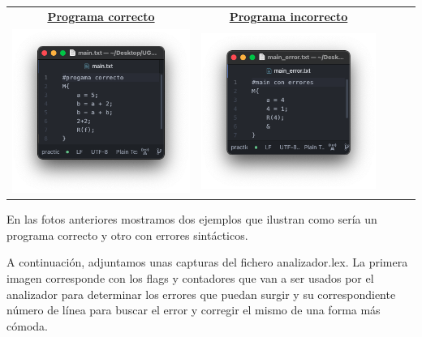 \begin{table}[H]
	\centering
	\begin{tabular}{lllll}
		\multicolumn{1}{c}{\underline{\textbf{Programa correcto}}} & \multicolumn{1}{c}{\underline{\textbf{Programa incorrecto}}} \\
		\multicolumn{1}{c}{\includegraphics[scale=0.5]{../practica_2/images/programa_correcto.png}} & \multicolumn{1}{c}{\includegraphics[scale=0.5]{../practica_2/images/programa_err.png}}
	\end{tabular}
\end{table}

En las fotos anteriores mostramos dos ejemplos que ilustran como sería un programa correcto y otro con errores sintácticos.

A continuación, adjuntamos unas capturas del fichero analizador.lex. La primera imagen corresponde con los flags y contadores que van a ser usados por el analizador para determinar los errores que puedan 
surgir y su correspondiente número de línea para buscar el error y corregir el mismo de una forma más cómoda. 

